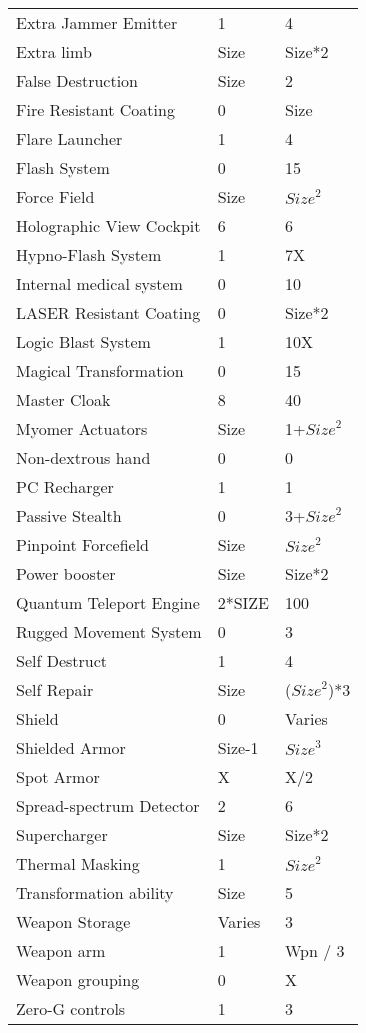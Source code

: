 \documentclass[twoside]{book}
\begin{document}
\begin{longtable}{p{1.25in}ll}
      \raggedright Extra Jammer Emitter&1&4\tabularnewline
      \raggedright Extra limb&Size&Size*2\tabularnewline
      \raggedright False Destruction&Size&2\tabularnewline
      \raggedright Fire Resistant Coating&0&Size\tabularnewline
      \raggedright Flare Launcher&1&4\tabularnewline
      \raggedright Flash System&0&15\tabularnewline
      \raggedright Force Field&Size&\begin{math}{Size}^{2}\end{math}\tabularnewline
      \raggedright Holographic View Cockpit&6&6\tabularnewline
      \raggedright Hypno-Flash System&1&7X\tabularnewline
      \raggedright Internal medical system&0&10\tabularnewline
      \raggedright LASER Resistant Coating&0&Size*2\tabularnewline
      \raggedright Logic Blast System&1&10X\tabularnewline
      \raggedright Magical Transformation&0&15\tabularnewline
      \raggedright Master Cloak&8&40\tabularnewline
      \raggedright Myomer Actuators&Size&1+\begin{math}{Size}^{2}\end{math}\tabularnewline
      \raggedright Non-dextrous hand&0&0\tabularnewline
      \raggedright PC Recharger&1&1\tabularnewline
      \raggedright Passive Stealth&0&3+\begin{math}{Size}^{2}\end{math}\tabularnewline
      \raggedright Pinpoint Forcefield&Size&\begin{math}{Size}^{2}\end{math}\tabularnewline
      \raggedright Power booster&Size&Size*2\tabularnewline
      \raggedright Quantum Teleport Engine&2*SIZE&100\tabularnewline
      \raggedright Rugged Movement System&0&3\tabularnewline
      \raggedright Self Destruct&1&4\tabularnewline
      \raggedright Self Repair&Size&(\begin{math}{Size}^{2}\end{math})*3\tabularnewline
      \raggedright Shield&0&Varies\tabularnewline
      \raggedright Shielded Armor&Size-1&\begin{math}{Size}^{3}\end{math}\tabularnewline
      \raggedright Spot Armor&X&X/2\tabularnewline
      \raggedright Spread-spectrum Detector&2&6\tabularnewline
      \raggedright Supercharger&Size&Size*2\tabularnewline
      \raggedright Thermal Masking&1&\begin{math}{Size}^{2}\end{math}\tabularnewline
      \raggedright Transformation ability&Size&5\tabularnewline
      \raggedright Weapon Storage&Varies&3\tabularnewline
      \raggedright Weapon arm&1&Wpn / 3\tabularnewline
      \raggedright Weapon grouping&0&X\tabularnewline
      \raggedright Zero-G controls&1&3\tabularnewline
      
\end{longtable}
    
\end{document}
